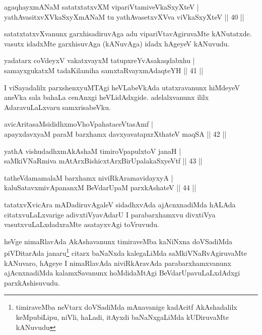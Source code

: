 \begin{shl}
agaqhayxmANaM satatxtatxvXM vipariVtamiveVkaSxyXteV  |\\
yathAvasitxvXVkaSxyXmANaM tu yathAvasetxvXVva viVkaSxyXteV \hfill || 40 ||
\end{shl}

\begin{artha}
satatxtatxvXvanunx garxhisadiruvAga adu vipariVtavAgiruvaMte kANutatxde.  vasutx idadxMte garxhisuvAga (kANuvAga) idadx hAgeyeV kANuvudu.
\end{artha}

\begin{shl}
yadatarx coVdeyxV vakatxvayxM tatupxreYvAsakaqdabxhu |\\
samayxgukatxM tadaKilamiha samxtaRvayxmAdaqteYH \hfill || 41 ||
\end{shl}

\begin{artha}
I viSayadalilx parxshenxyuMTAgi heVLabeVkAda utatxravanunx hiMdeyeV aneVka sala bahaLa cenAnxgi heVLidAdxgide. adelalxvanunx ililx AdaravuLaLxvaru samxrisabeVku.
\end{artha}


\begin{shl}
avicAritasaMsididhxmoVhoVpahataceVtasAmf |\\
apayxdavxyaM paraM barxhamx davxyavatapxrXthateV maqSA \hfill || 42 ||
\end{shl}

\begin{shl}
yathA vishudadhxmAkAshaM timiroVpapulxtoV janaH |\\
saMkiVNaRmiva mAtArxBishicxtArxBirUpalakaSxyeVtf \hfill || 43 ||
\end{shl}

\begin{shl}
tatheVdamamalaM barxhamx niviRkAramavidayxyA |\\
kaluSatavxmivA\s \s pananxM BeVdarUpaM parxkAshateV \hfill || 44 ||
\end{shl}

\begin{artha}%
tatatxvXvicAra mADadiruvAgaleV sidadhxvAda ajAcnxnadiMda hALAda citatxvuLaLxvarige adivxtiVyavAdarU I parabarxhamxvu divxtiVya vasutxvuLaLxdadxraMte asatayxvAgi toVruvudu.

heVge nimaRlavAda AkAshavanunx timiraveMba kaNiNxna doVSadiMda piVDitarAda janaru\footnote[1]{timiraveMba neVtarx doVSadiMda mAnavanige kadAcitf AkAshadalilx keMpubiLipu, niVli, haLadi, itAyxdi baNaNxgaLiMda kUDiruvaMte kANuvudu} citarx baNaNxda kalegaLiMda saMkiVNaRvAgiruvaMte kANuvaro, hAgeye I nimaRlavAda niviRkAravAda parabarxhamxvanunx ajAcnxnadiMda kalamxSavanunx hoMdidaMtAgi BeVdarUpavuLaLxdAdxgi parxkAshisuvudu.
\end{artha}

